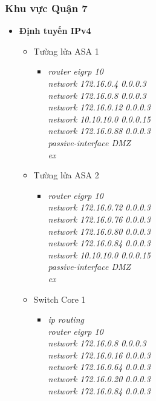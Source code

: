 \documentclass[a4paper, 12pt]{article}
\begin{document}
\subsubsection{Khu vực Quận 7}
\renewcommand{\labelitemi}{$\blacksquare$}
\renewcommand\labelitemii{$\nabla$}
\renewcommand\labelitemiii{$\square$}
\begin{itemize}
      \item \textbf{Định tuyến IPv4}
      
      \begin{itemize}
        \item Tường lửa ASA 1
        \begin{itemize}
          \item \textit{router eigrp 10\\
                    	network 172.16.0.4 0.0.0.3\\
                        network 172.16.0.8 0.0.0.3\\
                        network 172.16.0.12 0.0.0.3\\
                        network 10.10.10.0 0.0.0.15\\
                        network 172.16.0.88 0.0.0.3\\
                        passive-interface DMZ\\
                        ex\\}
        
        \end{itemize}
        \item Tường lửa ASA 2
        \begin{itemize}
         \item \textit{router eigrp 10\\
	network 172.16.0.72 0.0.0.3\\
network 172.16.0.76 0.0.0.3\\
network 172.16.0.80 0.0.0.3\\
network 172.16.0.84 0.0.0.3\\
network 10.10.10.0 0.0.0.15\\
passive-interface DMZ\\
ex\\}
         
          \end{itemize}
           \item Switch Core 1
        \begin{itemize}
         \item \textit{ip routing\\
                        router eigrp 10\\
                       network 172.16.0.8 0.0.0.3\\
                        network 172.16.0.16 0.0.0.3 \\
                        network 172.16.0.64 0.0.0.3 \\
                        network 172.16.0.20 0.0.0.3\\
                        network 172.16.0.84 0.0.0.3\\}
         

\end{itemize}
\end{itemize}
\end{itemize}
\end{document}

